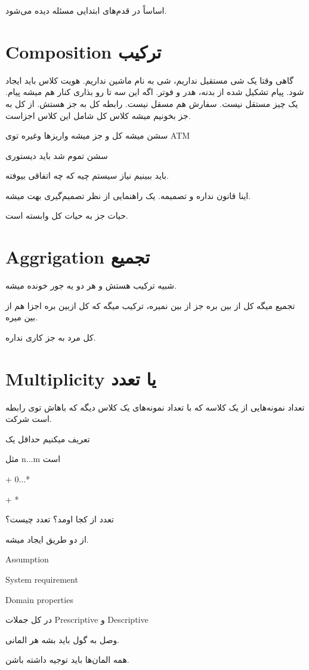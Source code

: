 اساساً در قدم‌های ابتدایی مسئله دیده می‌شود.

\section{Composition ترکیب}

گاهی وقتا یک شی مستقیل نداریم، شی به نام ماشین نداریم. هویت کلاس باید ایجاد شود.
پیام تشکیل شده از بدنه، هدر و فوتر. اگه این سه تا رو بذاری کنار هم میشه پیام. یک
چیز مستقل نیست. سفارش هم مسقل نیست. رابطه کل به جز هستش. از کل به جز بخونیم میشه
کلاس کل شامل این کلاس اجزاست. 

سشن میشه کل و جز میشه واریزها وغیره توی ATM

سشن تموم شد باید دیستوری

باید ببینیم نیاز سیستم چیه که چه اتفاقی بیوفته.

اینا قانون نداره و تصمیمه. یک راهنمایی از نظر تصمیم‌گیری بهت میشه.

حیات جز به حیات کل وابسته است.

\section{Aggrigation تجمیع}

شبیه ترکیب هستش و هر دو یه جور خونده میشه. 

تجمیع میگه کل از بین بره جز از بین نمیره، ترکیب میگه که کل ازبین بره اجزا هم از
بین میره.

کل مرد به جز کاری نداره.

\section{Multiplicity یا تعدد }

تعداد نمونه‌هایی از یک کلاسه که با تعداد نمونه‌های یک کلاس دیگه که باهاش توی
رابطه است شرکت.

تعریف میکنیم حداقل یک

مثل n...m است

+ 0...*

+ *

تعدد از کجا اومد؟ تعدد چیست؟

از دو طریق ایجاد میشه.

Assumption

System requirement

Domain properties

در کل جملات Prescriptive و Descriptive

وصل به گول باید بشه هر المانی.

همه المان‌ها باید توجیه داشته باشن.


